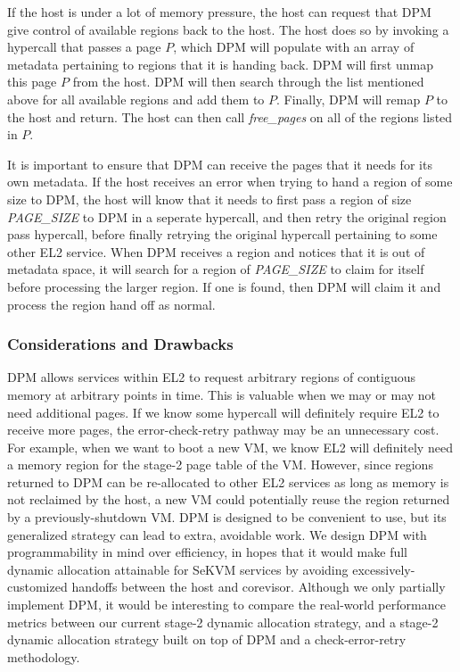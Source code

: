 If the host is under a lot of memory pressure, the host can request that DPM give control
of available regions back to the host. The host does so by invoking a hypercall that passes a page $P$, which DPM will populate with
an array of metadata pertaining to regions that it is handing back. DPM will first unmap this
page $P$ from the host. DPM will then search through the list mentioned above for all available regions and add them
to $P$. Finally, DPM will remap $P$ to the host and return. The host can then
call \textit{free\_pages} on all of the regions listed in $P$.

It is important to ensure that DPM can receive the pages that it needs for its own metadata.
If the host receives an error when trying to hand a region of some size to DPM, the host will know that it needs
to first pass a region of size \textit{PAGE\_SIZE} to DPM in a seperate hypercall, and then retry the
original region pass hypercall, before finally retrying the original hypercall pertaining
to some other EL2 service. 
When DPM receives a region and notices that it is out of metadata
space, it will search for a region of \textit{PAGE\_SIZE} to claim for itself before processing
the larger region. If one is found, then DPM will claim it and process the region hand off
as normal. 

\subsubsection{Considerations and Drawbacks}
DPM allows services within EL2 to request arbitrary regions of contiguous memory
at arbitrary points in time. This is valuable when we may or may not need additional pages.
If we know some hypercall will definitely require EL2 to receive more pages,
the error-check-retry pathway may be an unnecessary cost. For example, when we want to
boot a new VM, we know EL2 will definitely need a memory region for the stage-2 page table of the VM.
However, since regions returned to DPM can be re-allocated to other EL2 services as long
as memory is not reclaimed by the host, a new VM could potentially reuse the
region returned by a previously-shutdown VM. DPM is designed to be convenient to use,
but its generalized strategy can lead to extra, avoidable work. We design DPM with
programmability in mind over efficiency, in hopes that it would make full dynamic allocation
attainable for SeKVM services by avoiding excessively-customized handoffs between the host
and corevisor. Although we only partially implement DPM, it would be interesting to
compare the real-world performance metrics between our current stage-2 dynamic allocation
strategy, and a stage-2 dynamic allocation strategy built on top of DPM and a
check-error-retry methodology.

